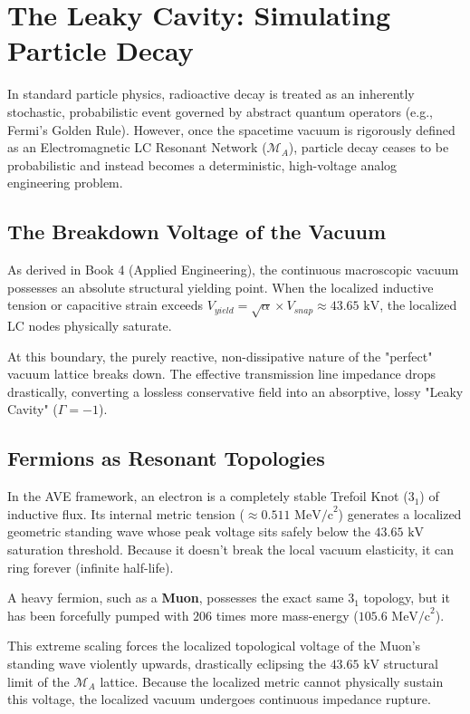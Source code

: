 \chapter{The Leaky Cavity: Simulating Particle Decay}
\label{ch:particle_decay}

In standard particle physics, radioactive decay is treated as an inherently stochastic, probabilistic event governed by abstract quantum operators (e.g., Fermi's Golden Rule). However, once the spacetime vacuum is rigorously defined as an Electromagnetic LC Resonant Network ($\mathcal{M}_A$), particle decay ceases to be probabilistic and instead becomes a deterministic, high-voltage analog engineering problem.

\section{The Breakdown Voltage of the Vacuum}
As derived in Book 4 (Applied Engineering), the continuous macroscopic vacuum possesses an absolute structural yielding point. When the localized inductive tension or capacitive strain exceeds $V_{yield} = \sqrt{\alpha} \times V_{snap} \approx 43.65 \text{ kV}$, the localized LC nodes physically saturate. 

At this boundary, the purely reactive, non-dissipative nature of the "perfect" vacuum lattice breaks down. The effective transmission line impedance drops drastically, converting a lossless conservative field into an absorptive, lossy "Leaky Cavity" ($\Gamma = -1$). 

\section{Fermions as Resonant Topologies}
In the AVE framework, an electron is a completely stable Trefoil Knot ($3_1$) of inductive flux. Its internal metric tension ($\approx 0.511 \text{ MeV/c}^2$) generates a localized geometric standing wave whose peak voltage sits safely below the $43.65 \text{ kV}$ saturation threshold. Because it doesn't break the local vacuum elasticity, it can ring forever (infinite half-life).

A heavy fermion, such as a \textbf{Muon}, possesses the exact same $3_1$ topology, but it has been forcefully pumped with $206$ times more mass-energy ($105.6 \text{ MeV/c}^2$). 

This extreme scaling forces the localized topological voltage of the Muon's standing wave violently upwards, drastically eclipsing the $43.65 \text{ kV}$ structural limit of the $\mathcal{M}_A$ lattice. Because the localized metric cannot physically sustain this voltage, the localized vacuum undergoes continuous impedance rupture.

